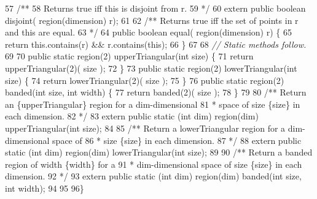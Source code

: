 \begin{tightcode}
\quad\num{57}    /**
\quad\num{58}       Returns true iff this is disjoint from r.
\quad\num{59}     */
\quad\num{60}    extern public boolean disjoint( region(dimension) r);
\quad\num{61}
\quad\num{62}    /** Returns true iff the set of points in r and this are equal.
\quad\num{63}     */
\quad\num{64}    public boolean equal( region(dimension) r) \{
\quad\num{65}        return this.contains(r) && r.contains(this);
\quad\num{66}    \}
\quad\num{67}
\quad\num{68}    \emph{// Static methods follow.}
\quad\num{69}
\quad\num{70}    public static region(2) upperTriangular(int size) \{
\quad\num{71}        return upperTriangular(2)( size );
\quad\num{72}    \}
\quad\num{73}    public static region(2) lowerTriangular(int size) \{
\quad\num{74}        return lowerTriangular(2)( size );
\quad\num{75}    \}
\quad\num{76}    public static region(2) banded(int size, int width) \{
\quad\num{77}        return banded(2)( size );
\quad\num{78}    \}
\quad\num{79}
\quad\num{80}    /** Return an \code\{upperTriangular\} region for a dim-dimensional
\quad\num{81}     * space of size \code\{size\} in each dimension.
\quad\num{82}     */
\quad\num{83}    extern public static (int dim) region(dim) upperTriangular(int size);
\quad\num{84}
\quad\num{85}    /** Return a lowerTriangular region for a dim-dimensional space of
\quad\num{86}     * size \code\{size\} in each dimension.
\quad\num{87}     */
\quad\num{88}    extern public static (int dim) region(dim) lowerTriangular(int size);
\quad\num{89}
\quad\num{90}    /** Return a banded region of width \{\code width\} for a
\quad\num{91}     * dim-dimensional space of size \{\code size\} in each dimension.
\quad\num{92}     */
\quad\num{93}    extern public static (int dim) region(dim) banded(int size, int width);
\quad\num{94}
\quad\num{95}
\quad\num{96}\}
\end{tightcode}
